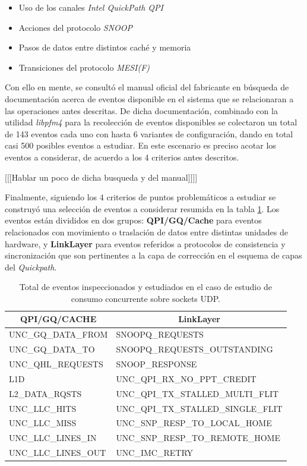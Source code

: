 \begin{itemize}
\item Uso de los canales \emph{Intel QuickPath QPI}
\item Acciones del protocolo \emph{SNOOP}
\item Pasos de datos entre distintos caché y memoria
\item Transiciones del protocolo \emph{MESI(F)}
\end{itemize}

Con ello en mente, se consultó el manual oficial del fabricante \cite{manual:bigbigevents} en búsqueda de documentación acerca de eventos disponible en el sistema que se relacionaran a las operaciones antes descritas. De dicha documentación, combinado con la utilidad \emph{libpfm4} para la recolección de eventos disponibles se colectaron un total de 143 eventos cada uno con hasta 6 variantes de configuración, dando en total casi 500 posibles eventos a estudiar. En este escenario es preciso acotar los eventos a considerar, de acuerdo a los 4 criterios antes descritos.


[[[Hablar un poco de dicha busqueda y del manual]]]]

Finalmente, siguiendo los 4 criterios de puntos problemáticos a estudiar se construyó una selección de eventos a considerar resumida en la tabla \ref{table:eventos}. Los eventos están divididos en dos grupos: \textbf{QPI/GQ/Cache} para eventos relacionados con movimiento o traslación de datos entre distintas unidades de hardware, y \textbf{LinkLayer} para eventos referidos a protocolos de consistencia y sincronización que son pertinentes a la capa de corrección en el esquema de capas del \emph{Quickpath}.

\begin{table}[h!]
\centering
\begin{tabular}{l|l}
\multicolumn{1}{c|}{{\bf QPI/GQ/CACHE}} & \multicolumn{1}{c}{{\bf LinkLayer}} \\ \hline
{ UNC\_GQ\_DATA\_FROM} & SNOOPQ\_REQUESTS \\
{ UNC\_GQ\_DATA\_TO} & SNOOPQ\_REQUESTS\_OUTSTANDING \\
{ UNC\_QHL\_REQUESTS} & SNOOP\_RESPONSE \\
{ L1D} & UNC\_QPI\_RX\_NO\_PPT\_CREDIT \\
{ L2\_DATA\_RQSTS} & UNC\_QPI\_TX\_STALLED\_MULTI\_FLIT \\
{ UNC\_LLC\_HITS} & UNC\_QPI\_TX\_STALLED\_SINGLE\_FLIT \\
{ UNC\_LLC\_MISS} & UNC\_SNP\_RESP\_TO\_LOCAL\_HOME \\
{ UNC\_LLC\_LINES\_IN} & UNC\_SNP\_RESP\_TO\_REMOTE\_HOME \\
{ UNC\_LLC\_LINES\_OUT} & UNC\_IMC\_RETRY
\end{tabular}
\caption{Total de eventos inspeccionados y estudiados en el caso de estudio de consumo concurrente sobre sockets UDP.}
\label{table:eventos}
\end{table}

